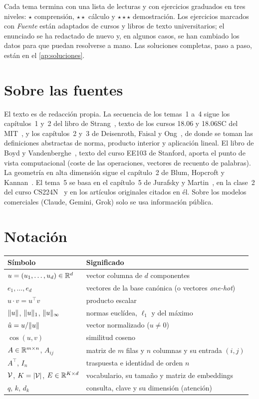 \documentclass[11pt,a4paper,twoside,openany]{book}
\begin{document}
Cada tema termina con una lista de lecturas y con ejercicios graduados en tres niveles: $\star$ comprensión, $\star\star$ cálculo y $\star\star\star$ demostración. Los ejercicios marcados con \emph{Fuente} están adaptados de cursos y libros de texto universitarios; el enunciado se ha redactado de nuevo y, en algunos casos, se han cambiado los datos para que puedan resolverse a mano. Las soluciones completas, paso a paso, están en el \cref{ap:soluciones}.

\section*{Sobre las fuentes}
El texto es de redacción propia. La secuencia de los temas~1 a~4 sigue los capítulos~1 y~2 del libro de Strang~\cite{strang}, texto de los cursos 18.06 y 18.06SC del MIT~\cite{mit1806,mit1806sc}, y los capítulos~2 y~3 de Deisenroth, Faisal y Ong~\cite{mml}, de donde se toman las definiciones abstractas de norma, producto interior y aplicación lineal. El libro de Boyd y Vandenberghe~\cite{vmls}, texto del curso EE103 de Stanford, aporta el punto de vista computacional (coste de las operaciones, vectores de recuento de palabras). La geometría en alta dimensión sigue el capítulo~2 de Blum, Hopcroft y Kannan~\cite{bhk}. El tema~5 se basa en el capítulo~5 de Jurafsky y Martin~\cite{jm3}, en la clase~2 del curso CS224N~\cite{cs224n} y en los artículos originales citados en él. Sobre los modelos comerciales (Claude, Gemini, Grok) solo se usa información pública.

\section*{Notación}
\begin{center}
\begin{tabular}{@{}ll@{}}
\toprule
Símbolo & Significado \\
\midrule
$u=(u_1,\dots,u_d)\in\mathbb{R}^{d}$ & vector columna de $d$ componentes \\
$e_1,\dots,e_d$ & vectores de la base canónica (o vectores \emph{one-hot}) \\
$u\cdot v=u^{\top}v$ & producto escalar \\
$\lVert u\rVert$, $\lVert u\rVert_1$, $\lVert u\rVert_\infty$ & normas euclídea, $\ell_1$ y del máximo \\
$\hat u=u/\lVert u\rVert$ & vector normalizado ($u\neq 0$) \\
$\cos(u,v)$ & similitud coseno \\
$A\in\mathbb{R}^{m\times n}$, $A_{ij}$ & matriz de $m$ filas y $n$ columnas y su entrada $(i,j)$ \\
$A^{\top}$, $I_n$ & traspuesta e identidad de orden $n$ \\
$\mathcal{V}$, $K=\lvert\mathcal{V}\rvert$, $E\in\mathbb{R}^{K\times d}$ & vocabulario, su tamaño y matriz de embeddings \\
$q$, $k$, $d_k$ & consulta, clave y su dimensión (atención) \\
\bottomrule
\end{tabular}
\end{center}
\end{document}
